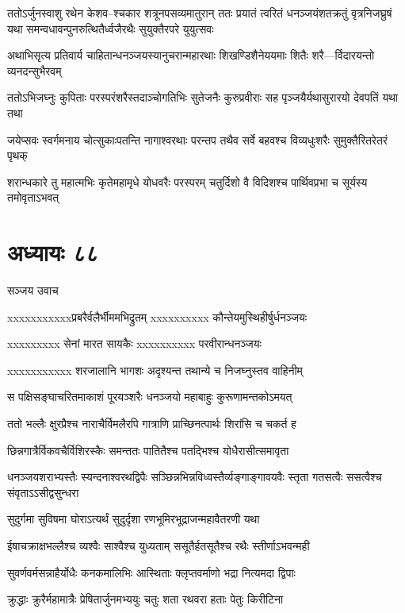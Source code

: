 \threelineshloka
{ततोऽर्जुनस्वाशु रथेन केशव--श्चकार शत्रूनपसव्यमातुरान्}
{ततः प्रयातं त्वरितं धनञ्जयंशतक्रतुं वृत्रनिजघ्रुषं यथा}
{समन्वधावन्पुनरुत्थितैर्ध्वजैरथैः सुयुक्तैरपरे युयुत्सवः}


\twolineshloka
{अथाभिसृत्य प्रतिवार्य चाहितान्धनञ्जयस्यानुचरान्महारथाः}
{शिखण्डिशैनेययमाः शितैः शरै---र्विदारयन्तो व्यनदन्सुभैरवम्}


\twolineshloka
{ततोऽभिजघ्नुः कुपिताः परस्परंशरैस्तदाञ्चोगतिभिः सुतेजनैः}
{कुरुप्रवीराः सह पृञ्जयैर्यथासुरारयो देवपतिं यथा तथा}


\twolineshloka
{जयेप्सवः स्वर्गमनाय चोत्सुकाःपतन्ति नागाश्वरथाः परन्तप}
{तथैव सर्वे बहवश्च विव्यधुःशरैः सुमुक्तैरितरेतरं पृथक्}


\twolineshloka
{शरान्धकारे तु महात्मभिः कृतेमहामृधे योधवरैः परस्परम्}
{चतुर्दिशो वै विदिशश्च पार्थिवप्रभा च सूर्यस्य तमोवृताऽभवत्}


\chapter{अध्यायः ८८}
\twolineshloka
{सञ्जय उवाच}
{}


\twolineshloka
{xxxxxxxxxxxप्रबरैर्वलैर्भीममभिद्रुतम्}
{xxxxxxxxxx कौन्तेयमुस्थिहीर्षुर्धनञ्जयः}


\twolineshloka
{xxxxxxxxx सेनां मारत सायकैः}
{xxxxxxxxxx परवीरान्धनञ्जयः}


\twolineshloka
{xxxxxxxxxxx शरजालानि भागशः}
{अदृश्यन्त तथान्ये च निजघ्नुस्तव वाहिनीम्}


\twolineshloka
{स पक्षिसङ्घाचरितमाकाशं पूरयञ्शरैः}
{धनञ्जयो महाबाहुः कुरूणामन्तकोऽमयत्}


\twolineshloka
{ततो भल्लैः क्षुरप्रैश्च नाराचैर्विमलैरपि}
{गात्राणि प्राच्छिनत्पार्थः शिरांसि च चकर्त ह}


\twolineshloka
{छिन्नगात्रैर्विकवचैर्विशिरस्कैः समन्ततः}
{पातितैश्च पतद्भिश्च योधैरासीत्समावृता}


\threelineshloka
{धनञ्जयशराभ्यस्तैः स्यन्दनाश्वरथद्विपैः}
{सञ्छिन्नभिन्नविध्वस्तैर्व्यङ्गाङ्गावयवैः स्तृता}
{गतसत्वैः ससत्वैश्च संवृताऽऽसीद्वसुन्धरा}


\twolineshloka
{सुदुर्गमा सुविषमा घोराऽत्यर्थं सुदुर्दृशा}
{रणभूमिरभूद्राजन्महावैतरणी यथा}


\twolineshloka
{ईषाचक्राक्षभल्लैश्च व्यश्वैः साश्वैश्च युध्यताम्}
{ससूतैर्हतसूतैश्च रथैः स्तीर्णाऽभवन्मही}


\twolineshloka
{सुवर्णवर्मसन्नाहैर्योधैः कनकमालिभिः}
{आस्थिताः क्लृप्तवर्माणो भद्रा नित्यमदा द्विपाः}


\twolineshloka
{क्रुद्धाः क्रुरैर्महामात्रैः प्रेषितार्जुनमभ्ययुः}
{चतुः शता रथवरा हताः पेतुः किरीटिना}


